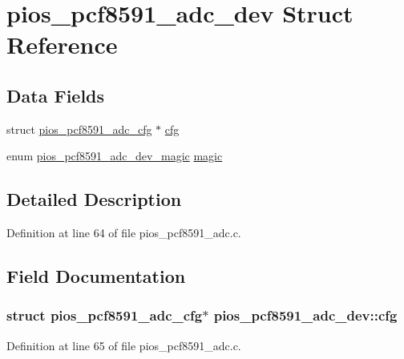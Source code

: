 \hypertarget{structpios__pcf8591__adc__dev}{\section{pios\-\_\-pcf8591\-\_\-adc\-\_\-dev \-Struct \-Reference}
\label{structpios__pcf8591__adc__dev}
}
\subsection*{\-Data \-Fields}
\begin{DoxyCompactItemize}
\item 
struct \hyperlink{structpios__pcf8591__adc__cfg}{pios\-\_\-pcf8591\-\_\-adc\-\_\-cfg} $\ast$ \hyperlink{structpios__pcf8591__adc__dev_a4cb2ed802177d978d7e8546eaf1d5bb4}{cfg}
\item 
enum \hyperlink{group___p_i_o_s___p_c_f8591___a_d_c_ga6540537fe983c01aed8d16cc97711b14}{pios\-\_\-pcf8591\-\_\-adc\-\_\-dev\-\_\-magic} \hyperlink{structpios__pcf8591__adc__dev_ae9e3e9fe7b242736640f5e5c5846efe3}{magic}
\end{DoxyCompactItemize}


\subsection{\-Detailed \-Description}


\-Definition at line 64 of file pios\-\_\-pcf8591\-\_\-adc.\-c.



\subsection{\-Field \-Documentation}
\hypertarget{structpios__pcf8591__adc__dev_a4cb2ed802177d978d7e8546eaf1d5bb4}{
\subsubsection[{cfg}]{\setlength{\rightskip}{0pt plus 5cm}struct {\bf pios\-\_\-pcf8591\-\_\-adc\-\_\-cfg}$\ast$ {\bf pios\-\_\-pcf8591\-\_\-adc\-\_\-dev\-::cfg}}}\label{structpios__pcf8591__adc__dev_a4cb2ed802177d978d7e8546eaf1d5bb4}


\-Definition at line 65 of file pios\-\_\-pcf8591\-\_\-adc.\-c.

